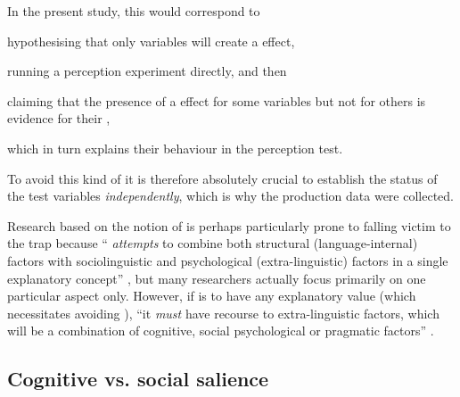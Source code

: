 In the present study, this would correspond to
\begin{inparaenum}[(1)]
	\item hypothesising that only  variables will create a  effect,
	\item running a perception experiment directly, and then
	\item claiming that the presence of a  effect for some variables but not for others is evidence for their ,
	\item which in turn explains their behaviour in the perception test.
\end{inparaenum}
To avoid this kind of  it is therefore absolutely crucial to establish the  status of the test variables \emph{independently}, which is why the production data were collected.

Research based on the notion of  is perhaps particularly prone to falling victim to the  trap because `` \emph{attempts} to combine both structural (language-internal) factors with sociolinguistic and psychological (extra-linguistic) factors in a single explanatory concept'' \parencite[83, my emphasis]{kerswillwilliams2002}, but many researchers actually focus primarily on one particular aspect only.
However, if  is to have any explanatory value (which necessitates avoiding ), ``it \emph{must} have recourse to extra-linguistic factors, which will be a combination of cognitive, social psychological or pragmatic factors'' \parencite[83, my emphasis]{kerswillwilliams2002}.

		\subsection{Cognitive vs. social salience}
		\label{sec.sal.sal.cog}

